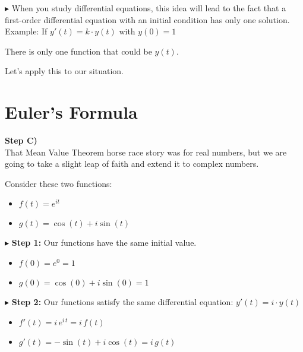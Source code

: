 \documentclass{ximera}
\begin{document}
$\blacktriangleright$  When you study differential equations, this idea will lead to the fact that a first-order differential equation with an initial condition has only one solution. \\

Example: If $y'(t) = k \cdot y(t)$ with $y(0)=1$


There is only one function that could be $y(t)$.

Let's apply this to our situation. \\















\section{Euler's Formula}


\textbf{\textcolor{purple!85!blue}{Step C)}} \\


That Mean Value Theorem horse race story was for real numbers, but we are going to take a slight leap of faith and extend it to complex numbers.




Consider these two functions:


\begin{itemize}
	\item $f(t) = e^{i t}$
	\item $g(t) = \cos(t) + i \sin(t)$
\end{itemize}




$\blacktriangleright$   \textbf{Step 1:} Our functions have the same initial value.

\begin{itemize}
	\item $f(0) = e^0 = 1$
	\item $g(0) = \cos(0) + i \sin(0) = 1$
\end{itemize}





$\blacktriangleright$   \textbf{Step 2:} Our functions satisfy the same differential equation: $y'(t) = i \cdot y(t)$



\begin{itemize}
	\item $f'(t) = i \, e^{i \, t} = i \, f(t)$
	\item $g'(t) = -\sin(t) + i \cos(t) = i \, g(t)$
\end{itemize}
\end{document}
